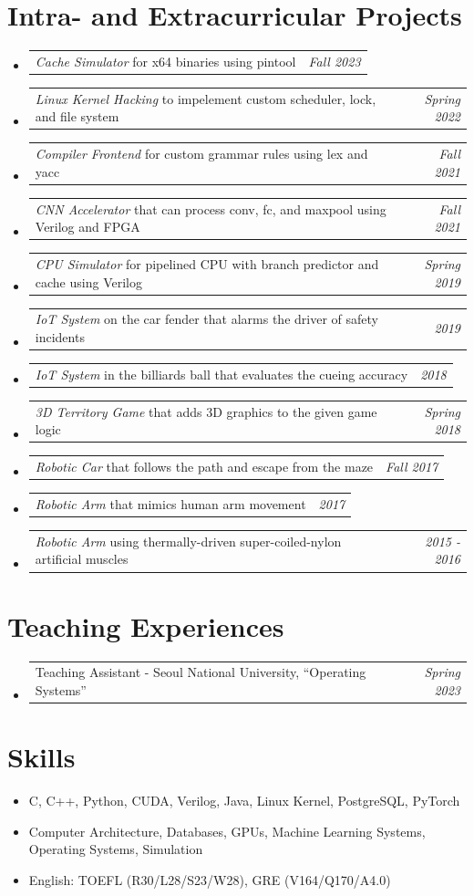 \documentclass[a4paper]{article}
\makeatletter
\newcommand{\resumeSubheadingSimple}[2]{
  \vspace{-1pt}\item
	\begin{tabular*}{0.97\textwidth}{l@{\extracolsep{\fill}}r}
	  #1 & \textit{#2} \\
	\end{tabular*}
  \vspace{-1pt}
}
\newcommand{\resumeSubheadingVerySimple}[1]{
	\vspace{-1pt}\item #1
	\vspace{-1pt}
}
\newcommand{\resumeSubHeadingListStart}{\begin{itemize}[leftmargin=*]}
\newcommand{\resumeSubHeadingListEnd}{\end{itemize}}
\makeatother
\begin{document}
\section{Intra- and Extracurricular Projects}
\resumeSubHeadingListStart
	\resumeSubheadingSimple{
		\textit{Cache Simulator} for x64 binaries using pintool
	}{Fall 2023}
	\resumeSubheadingSimple{
		\textit{Linux Kernel Hacking} to impelement custom scheduler, lock, and file system
	}{Spring 2022}
	\resumeSubheadingSimple{
		\textit{Compiler Frontend} for custom grammar rules using lex and yacc
	}{Fall 2021}
	\resumeSubheadingSimple{
		\textit{CNN Accelerator} that can process conv, fc, and maxpool using Verilog and FPGA
	}{Fall 2021}
	\resumeSubheadingSimple{
		\textit{CPU Simulator} for pipelined CPU with branch predictor and cache using Verilog
	}{Spring 2019}
	\resumeSubheadingSimple{
		\textit{IoT System} on the car fender that alarms the driver of safety incidents
	}{2019}
	\resumeSubheadingSimple{
		\textit{IoT System} in the billiards ball that evaluates the cueing accuracy
	}{2018}
	\resumeSubheadingSimple{
		\textit{3D Territory Game} that adds 3D graphics to the given game logic
	}{Spring 2018}
	\resumeSubheadingSimple{
		\textit{Robotic Car} that follows the path and escape from the maze
	}{Fall 2017}
	\resumeSubheadingSimple{
		\textit{Robotic Arm} that mimics human arm movement
	}{2017}
	\resumeSubheadingSimple{
		\textit{Robotic Arm} using thermally-driven super-coiled-nylon artificial muscles
	}{2015 - 2016}
\resumeSubHeadingListEnd

\section{Teaching Experiences}
\resumeSubHeadingListStart
	\resumeSubheadingSimple{
		Teaching Assistant - Seoul National University, ``Operating Systems''
	}{Spring 2023}
\resumeSubHeadingListEnd

\section{Skills}
\resumeSubHeadingListStart
	\resumeSubheadingVerySimple{
		C, C++, Python, CUDA, Verilog, Java, Linux Kernel, PostgreSQL, PyTorch
	}
	\resumeSubheadingVerySimple{
		Computer Architecture, Databases, GPUs, Machine Learning Systems, Operating Systems, Simulation
	}
	\resumeSubheadingVerySimple{
		English: TOEFL (R30/L28/S23/W28), GRE (V164/Q170/A4.0)
	}
\resumeSubHeadingListEnd
\end{document}
